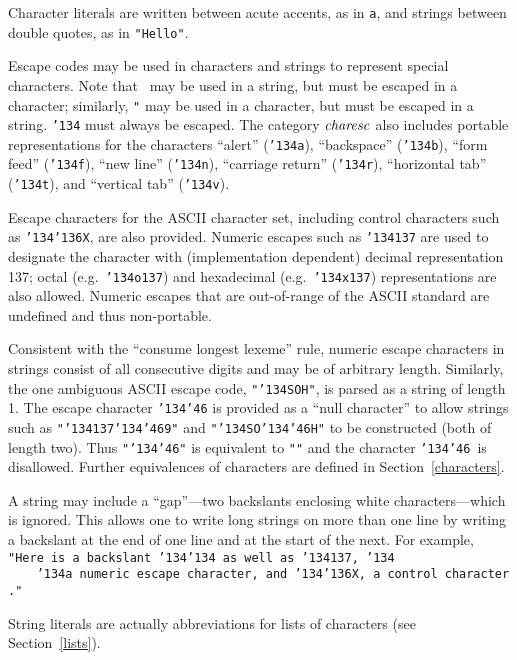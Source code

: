 %
%
%
%
%
%
%
%
%

Character literals are written between acute accents, as in
\fwq\mbox{\tt a}\fwq, and strings between double quotes, as in \mbox{\tt "Hello"}.

Escape codes may be used in characters and strings to represent
special characters.  Note that \fwq\ may be used in a string, but
must be escaped in a character; similarly, \mbox{\tt "} may be used in a
character, but must be escaped in a string.  \mbox{\tt {\char'134}} must always be
escaped.  The category \mbox{$\it charesc$} also includes portable
representations for the characters ``alert'' (\mbox{\tt {\char'134}a}), ``backspace''
(\mbox{\tt {\char'134}b}), ``form feed'' (\mbox{\tt {\char'134}f}), ``new line'' (\mbox{\tt {\char'134}n}), ``carriage return''
(\mbox{\tt {\char'134}r}), ``horizontal tab'' (\mbox{\tt {\char'134}t}), and ``vertical tab'' (\mbox{\tt {\char'134}v}).

Escape characters for the ASCII character
set, including
control characters such as \mbox{\tt {\char'134}{\char'136}X}, are also provided.
Numeric escapes such as \mbox{\tt {\char'134}137} are used to designate the character
with (implementation dependent) decimal representation 137; octal
(e.g.~\mbox{\tt {\char'134}o137}) and hexadecimal (e.g.~\mbox{\tt {\char'134}x137}) representations are also
allowed.  Numeric escapes that are out-of-range of the ASCII standard
are undefined and thus non-portable.

Consistent with the ``consume longest lexeme'' rule,
numeric escape
characters in strings consist of all consecutive digits and may
be of arbitrary length.  Similarly, the one ambiguous ASCII escape
code, \mbox{\tt "{\char'134}SOH"}, is parsed as a string of length 1.  The escape
character \mbox{\tt {\char'134}{\char'46}} is provided as a ``null character'' to allow strings
such as \mbox{\tt "{\char'134}137{\char'134}{\char'46}9"} and \mbox{\tt "{\char'134}SO{\char'134}{\char'46}H"} to be constructed (both of length
two).  Thus \mbox{\tt "{\char'134}{\char'46}"} is equivalent to \mbox{\tt ""} and the character
\fwq\mbox{\tt {\char'134}{\char'46}}\fwq\ is disallowed.  Further equivalences of characters
are defined in Section~\ref{characters}.

A string may include a ``gap''---two backslants enclosing
white characters---which is ignored.
This allows one to write long strings on more than one line by writing
a backslant at the end of one line and at the start of the next.  For
example,
\bprog
\mbox{\tt "Here\ is\ a\ backslant\ {\char'134}{\char'134}\ as\ well\ as\ {\char'134}137,\ {\char'134}}\\
\mbox{\tt \ \ \ \ {\char'134}a\ numeric\ escape\ character,\ and\ {\char'134}{\char'136}X,\ a\ control\ character."}
\eprogNoSkip

String literals are actually abbreviations for lists of characters
(see Section~\ref{lists}).

